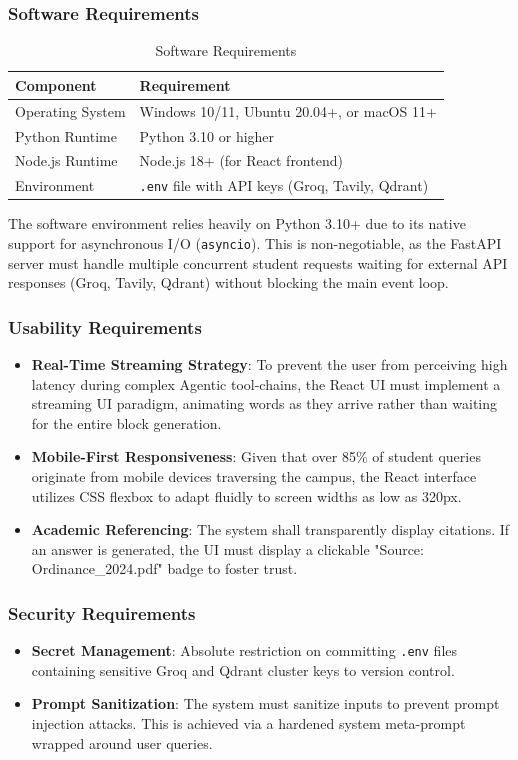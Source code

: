 \documentclass[12pt,a4paper]{report}
\begin{document}
\subsubsection{Software Requirements}
\begin{table}[h]
\centering
\caption{Software Requirements}
\label{tab:soft_req}
\begin{tabularx}{\textwidth}{|l|X|}
\hline
\textbf{Component} & \textbf{Requirement} \\ \hline
Operating System & Windows 10/11, Ubuntu 20.04+, or macOS 11+ \\ \hline
Python Runtime & Python 3.10 or higher \\ \hline
Node.js Runtime & Node.js 18+ (for React frontend) \\ \hline
Environment & \texttt{.env} file with API keys (Groq, Tavily, Qdrant) \\ \hline
\end{tabularx}
\end{table}
The software environment relies heavily on Python 3.10+ due to its native support for asynchronous I/O (\texttt{asyncio}). This is non-negotiable, as the FastAPI server must handle multiple concurrent student requests waiting for external API responses (Groq, Tavily, Qdrant) without blocking the main event loop.

\subsubsection{Usability Requirements}
\begin{itemize}
    \item \textbf{Real-Time Streaming Strategy}: To prevent the user from perceiving high latency during complex Agentic tool-chains, the React UI must implement a streaming UI paradigm, animating words as they arrive rather than waiting for the entire block generation.
    \item \textbf{Mobile-First Responsiveness}: Given that over 85\% of student queries originate from mobile devices traversing the campus, the React interface utilizes CSS flexbox to adapt fluidly to screen widths as low as 320px.
    \item \textbf{Academic Referencing}: The system shall transparently display citations. If an answer is generated, the UI must display a clickable "Source: Ordinance\_2024.pdf" badge to foster trust.
\end{itemize}

\subsubsection{Security Requirements}
\begin{itemize}
    \item \textbf{Secret Management}: Absolute restriction on committing \texttt{.env} files containing sensitive Groq and Qdrant cluster keys to version control.
    \item \textbf{Prompt Sanitization}: The system must sanitize inputs to prevent prompt injection attacks. This is achieved via a hardened system meta-prompt wrapped around user queries.
\end{itemize}
\end{document}
